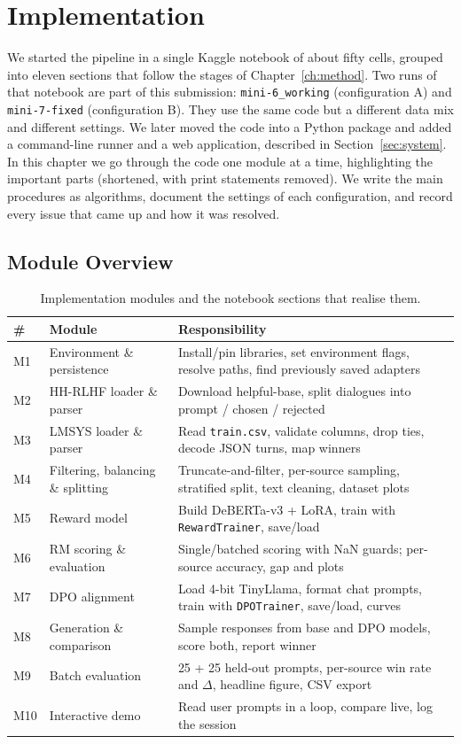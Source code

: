 \chapter{Implementation}
\label{ch:impl}

We started the pipeline in a single Kaggle notebook of about fifty cells, grouped into eleven sections that follow the stages of Chapter~\ref{ch:method}. Two runs of that notebook are part of this submission: \texttt{mini-6\_working} (configuration A) and \texttt{mini-7-fixed} (configuration B). They use the same code but a different data mix and different settings. We later moved the code into a Python package and added a command-line runner and a web application, described in Section~\ref{sec:system}. In this chapter we go through the code one module at a time, highlighting the important parts (shortened, with print statements removed). We write the main procedures as algorithms, document the settings of each configuration, and record every issue that came up and how it was resolved.

\section{Module Overview}
\label{sec:modules}

\begin{table}[!htbp]
\centering
\caption[Implementation modules]{Implementation modules and the notebook sections that realise them.}
\label{tab:modules}
\small
\begin{tabularx}{\textwidth}{@{}L{0.7cm}L{4.1cm}Y@{}}
\toprule
\textbf{\#} & \textbf{Module} & \textbf{Responsibility}\\
\midrule
M1 & Environment \& persistence & Install/pin libraries, set environment flags, resolve paths, find previously saved adapters\\
M2 & HH-RLHF loader \& parser & Download helpful-base, split dialogues into prompt / chosen / rejected\\
M3 & LMSYS loader \& parser & Read \texttt{train.csv}, validate columns, drop ties, decode JSON turns, map winners\\
M4 & Filtering, balancing \& splitting & Truncate-and-filter, per-source sampling, stratified split, text cleaning, dataset plots\\
M5 & Reward model & Build DeBERTa-v3 + LoRA, train with \texttt{RewardTrainer}, save/load\\
M6 & RM scoring \& evaluation & Single/batched scoring with NaN guards; per-source accuracy, gap and plots\\
M7 & DPO alignment & Load 4-bit TinyLlama, format chat prompts, train with \texttt{DPOTrainer}, save/load, curves\\
M8 & Generation \& comparison & Sample responses from base and DPO models, score both, report winner\\
M9 & Batch evaluation & 25 + 25 held-out prompts, per-source win rate and $\Delta$, headline figure, CSV export\\
M10 & Interactive demo & Read user prompts in a loop, compare live, log the session\\
\bottomrule
\end{tabularx}
\end{table}

